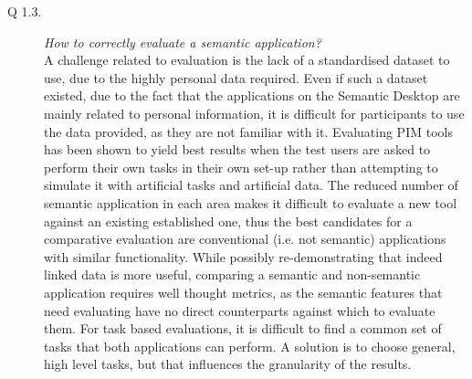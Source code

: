 \begin{description}
 \item[Q 1.3.] \emph{How to correctly evaluate a semantic application?}\\
A challenge related to evaluation is the lack of a standardised dataset to use, due to the highly personal data required. Even if such a dataset existed, due to the fact that the applications on the Semantic Desktop are mainly related to personal information, it is difficult for participants to use the data provided, as they are not familiar with it. Evaluating PIM tools has been shown to yield best results when the test users are asked to perform their own tasks in their own set-up rather than attempting to simulate it with artificial tasks and artificial data. The reduced number of semantic application in each area makes it difficult to evaluate a new tool against an existing established one, thus the best candidates for a comparative evaluation are conventional (i.e. not semantic) applications with similar functionality. While possibly re-demonstrating that indeed linked data is more useful, comparing a semantic and non-semantic application requires well thought metrics, as the semantic features that need 
evaluating have no direct counterparts against which to evaluate them. For task based evaluations, it is difficult to find a common set of tasks that both applications can perform. A solution is to choose general, high level tasks, but that influences the granularity of the results.
\end{description}
